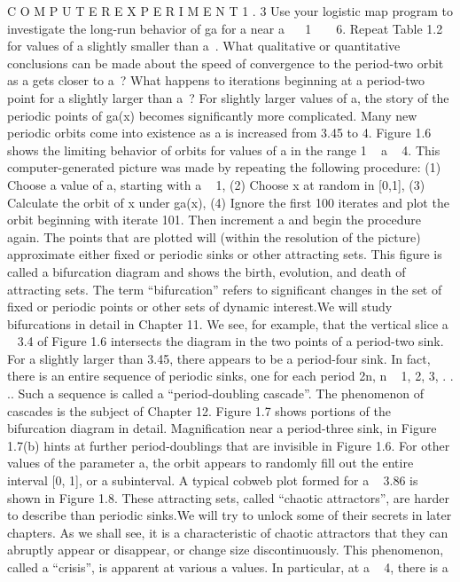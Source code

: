 \documentclass{article}
\begin{document}
C O M P U T E R E X P E R I M E N T 1 . 3
Use your logistic map program to investigate the long-run behavior of ga
for a near a    1  
 
6. Repeat Table 1.2 for values of a slightly smaller than
a . What qualitative or quantitative conclusions can be made about the speed
of convergence to the period-two orbit as a gets closer to a ? What happens to
iterations beginning at a period-two point for a slightly larger than a ?
For slightly larger values of a, the story of the periodic points of ga(x)
becomes significantly more complicated. Many new periodic orbits come into
existence as a is increased from 3.45 to 4. Figure 1.6 shows the limiting behavior
of orbits for values of a in the range 1   a   4. This computer-generated picture
was made by repeating the following procedure: (1) Choose a value of a, starting
with a   1, (2) Choose x at random in [0,1], (3) Calculate the orbit of x under
ga(x), (4) Ignore the first 100 iterates and plot the orbit beginning with iterate
101. Then increment a and begin the procedure again. The points that are plotted
will (within the resolution of the picture) approximate either fixed or periodic
sinks or other attracting sets. This figure is called a bifurcation diagram and shows
the birth, evolution, and death of attracting sets. The term “bifurcation” refers to
significant changes in the set of fixed or periodic points or other sets of dynamic
interest.We will study bifurcations in detail in Chapter 11.
We see, for example, that the vertical slice a   3.4 of Figure 1.6 intersects
the diagram in the two points of a period-two sink. For a slightly larger than
3.45, there appears to be a period-four sink. In fact, there is an entire sequence of
periodic sinks, one for each period 2n, n   1, 2, 3, . . .. Such a sequence is called a
“period-doubling cascade”. The phenomenon of cascades is the subject of Chapter
12. Figure 1.7 shows portions of the bifurcation diagram in detail. Magnification
near a period-three sink, in Figure 1.7(b) hints at further period-doublings that
are invisible in Figure 1.6.
For other values of the parameter a, the orbit appears to randomly fill out the
entire interval [0, 1], or a subinterval. A typical cobweb plot formed for a   3.86
is shown in Figure 1.8. These attracting sets, called “chaotic attractors”, are harder
to describe than periodic sinks.We will try to unlock some of their secrets in later
chapters. As we shall see, it is a characteristic of chaotic attractors that they can
abruptly appear or disappear, or change size discontinuously. This phenomenon,
called a “crisis”, is apparent at various a values. In particular, at a   4, there is a
\end{document}
